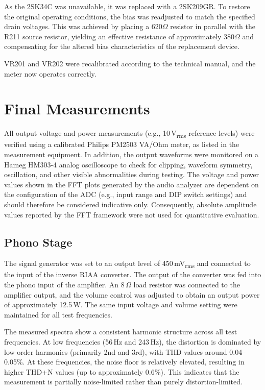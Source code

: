 \documentclass[]{article}
\begin{document}
As the 2SK34C was unavailable, it was replaced with a 2SK209GR. To restore the original operating conditions, the bias was readjusted to match the specified drain voltages. This was achieved by placing a $620 \Omega$ resistor in parallel with the R211 source resistor, yielding an effective resistance of approximately $380 \Omega$ and compensating for the altered bias characteristics of the replacement device.

VR201 and VR202 were recalibrated according to the technical manual, and the meter now operates correctly.

\section{Final Measurements}

All output voltage and power measurements (e.g., 10\,V\textsubscript{rms} reference levels) were verified using a calibrated Philips PM2503 VA/Ohm meter, as listed in the measurement equipment. In addition, the output waveforms were monitored on a Hameg HM303-4 analog oscilloscope to check for clipping, waveform symmetry, oscillation, and other visible abnormalities during testing. The voltage and power values shown in the FFT plots generated by the audio analyzer are dependent on the configuration of the ADC (e.g., input range and DIP switch settings) and should therefore be considered indicative only. Consequently, absolute amplitude values reported by the FFT framework were not used for quantitative evaluation.

\subsection{Phono Stage}

The signal generator was set to an output level of 450\,mV\textsubscript{rms} and connected to the input of the inverse RIAA converter. The output of the converter was fed into the phono input of the amplifier. An 8\,\(\Omega\) load resistor was connected to the amplifier output, and the volume control was adjusted to obtain an output power of approximately 12.5\,W. The same input voltage and volume setting were maintained for all test frequencies.

The measured spectra show a consistent harmonic structure across all test frequencies. At low frequencies (56\,Hz and 243\,Hz), the distortion is dominated by low-order harmonics (primarily 2nd and 3rd), with THD values around 0.04--0.05\%. At these frequencies, the noise floor is relatively elevated, resulting in higher THD+N values (up to approximately 0.6\%). This indicates that the measurement is partially noise-limited rather than purely distortion-limited.
\end{document}

